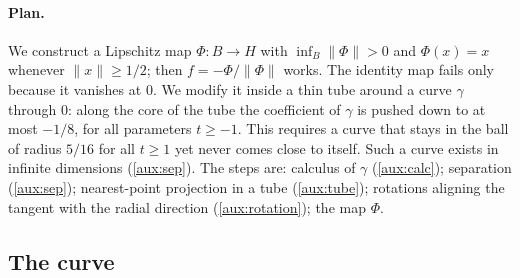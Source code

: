 \documentclass[11pt]{article}
\newcommand{\norm}[1]{\lVert #1\rVert}
\theoremstyle{definition}
\numberwithin{equation}{section}
\begin{document}
\paragraph{Plan.}
We construct a Lipschitz map \(\Phi:B\to H\) with
\(\inf_B\norm{\Phi}>0\) and \(\Phi(x)=x\) whenever \(\norm{x}\ge1/2\); then
\(f=-\Phi/\norm{\Phi}\) works. The identity map fails only because it vanishes
at \(0\). We modify it inside a thin tube around a curve \(\gamma\) through
\(0\): along the core of the tube the coefficient of \(\gamma\) is pushed down
to at most \(-1/8\), for all parameters \(t\ge-1\). This requires a curve that
stays in the ball of radius \(5/16\) for all \(t\ge1\) yet never comes close
to itself. Such a curve exists in infinite dimensions (\cref{aux:sep}). The
steps are: calculus of \(\gamma\) (\cref{aux:calc}); separation
(\cref{aux:sep}); nearest-point projection in a tube (\cref{aux:tube});
rotations aligning the tangent with the radial direction
(\cref{aux:rotation}); the map \(\Phi\).

\subsection{The curve}
\end{document}
